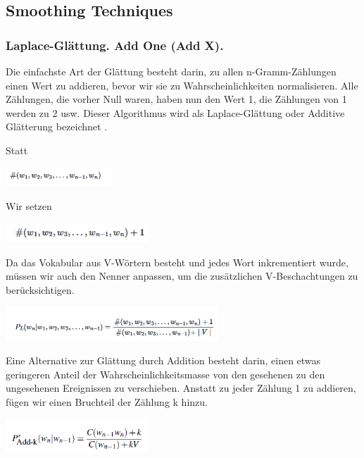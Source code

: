 \documentclass[12pt]{article}
\begin{document}
\subsection{Smoothing Techniques}
\subsubsection{Laplace-Glättung. Add One (Add X).}
Die einfachste Art der Glättung besteht darin, zu allen n-Gramm-Zählungen einen Wert zu addieren, bevor wir sie zu Wahrscheinlichkeiten normalisieren. Alle Zählungen, die vorher Null waren, haben nun den Wert 1, die Zählungen von 1 werden zu 2 usw. Dieser Algorithmus wird als Laplace-Glättung oder Additive Glätterung bezeichnet \cite{foster2020}.

Statt
\begin{center}
	\includegraphics[width=0.3\textwidth]{statics/Borisov/1.PNG}
\end{center}

Wir setzen
\begin{center}
	\includegraphics[width=0.4\textwidth]{statics/Borisov/2.PNG}
\end{center}

Da das Vokabular aus V-Wörtern besteht und jedes Wort inkrementiert wurde, müssen wir auch den Nenner anpassen, um die zusätzlichen V-Beschachtungen zu berücksichtigen.
\begin{center}
	\includegraphics[width=0.6\textwidth]{statics/Borisov/3.PNG}
\end{center}

\cite{maucher2022}

Eine Alternative zur Glättung durch Addition besteht darin, einen etwas geringeren Anteil der Wahrscheinlichkeitsmasse von den gesehenen zu den ungesehenen Ereignissen zu verschieben. Anstatt zu jeder Zählung 1 zu addieren, fügen wir einen Bruchteil der Zählung k hinzu.
\begin{center}
	\includegraphics[width=0.4\textwidth]{statics/Borisov/4.PNG}
\end{center}
\end{document}
